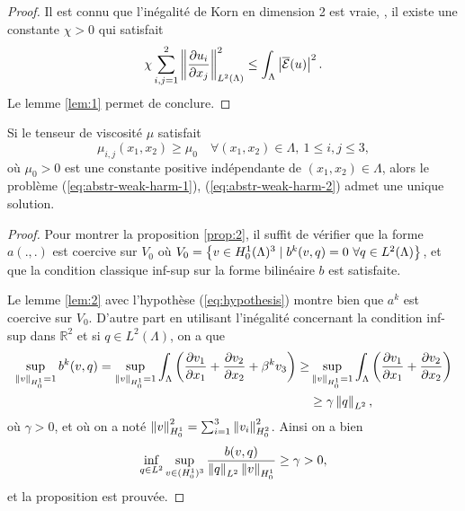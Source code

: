 \begin{proof}
Il est connu que l'inégalité de Korn en dimension 2 est vraie, \ie, il
existe une constante $\chi > 0$ qui satisfait
\begin{equation}
\chi\sum_{i,j = 1}^2 \left\lVert \frac{\partial u_i}{\partial
    x_j} \right\rVert^2_{L^2(\Lambda)} \leq \int_\Lambda \left\lvert \overline{\mathcal E}(u) \right\rvert^2.
\end{equation}
Le lemme \ref{lem:1} permet de conclure.
\end{proof}

\begin{proposition}\label{prop:2}
  Si le tenseur de viscosité $\mu$ satisfait
\begin{equation}
  \mu_{i,j}(x_1,x_2) \geq \mu_0\quad \forall (x_1, x_2)\in \Lambda,\ 1
  \leq i,j \leq 3,\label{eq:hypothesis}
\end{equation}
où $\mu_0 > 0$ est une constante positive indépendante de $(x_1,
x_2)\in \Lambda$, alors le problème (\ref{eq:abstr-weak-harm-1}),
(\ref{eq:abstr-weak-harm-2}) admet une unique solution.
\end{proposition}

\begin{proof}
  Pour montrer la proposition \ref{prop:2}, il suffit de vérifier
  que la forme $a(.,.)$ est coercive sur $V_0$ où $V_0 = \left\{ v
    \in H_0^1(\Lambda)^3\mid b^k(v, q) = 0\ \forall q \in
    L^2(\Lambda) \right\}$, et que la condition classique inf-sup sur la forme
  bilinéaire $b$ est satisfaite.

  Le lemme \ref{lem:2} avec l'hypothèse (\ref{eq:hypothesis}) montre
  bien que $a^k$ est coercive sur $V_0$. D'autre part en utilisant
  l'inégalité concernant la condition inf-sup dans $\mathbb R^2$ et si
  $q\in L^2(\Lambda)$, on a que
  \begin{align*}
    \sup_{\left\lVert v \right\rVert_{H^1_0} = 1} b^k(v,q)
    = \sup_{\left\lVert v \right\rVert_{H^1_0} = 1} \int_{\Lambda}\left( \frac{\partial v_1}{\partial x_1} + \frac{\partial v_2}{\partial x_2} + \beta^k v_3 \right)
    \geq & \sup_{\left\lVert v \right\rVert_{H^1_0} = 1}\int_{\Lambda}\left( \frac{\partial v_1}{\partial x_1} + \frac{\partial v_2}{\partial x_2} \right)\\
    &\geq \gamma \left\lVert q \right\rVert_{L^2},
  \end{align*}
  où $\gamma > 0$, et où on a noté $\left\lVert v \right\rVert_{H_0^1}^2 = \sum_{i =
    1}^3 \left\lVert v_i \right\rVert_{H_0^2}^2$. Ainsi on a bien
  \begin{equation}
    \inf_{q\in L^2}\sup_{v\in (H_0^1)^3} \frac{b(v,
      q)}{\left\lVert q \right\rVert_{L^2}\left\lVert v \right\rVert_{H^1_0}} \geq \gamma > 0,
  \end{equation}
  et la proposition est prouvée.
\end{proof}

